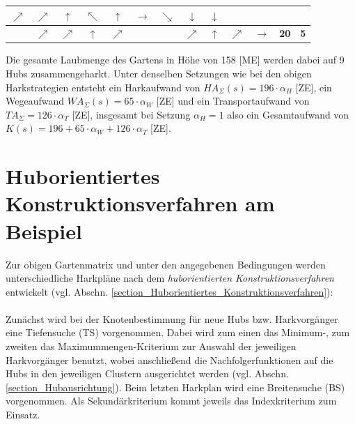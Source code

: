 \begin{center}
\begin{minipage}{\textwidth}
\begin{table}[H]
\begin{scriptsize}
\begin{tabular}{|>{}c|>{}c|>{}c|>{}c|>{}c|>{}c|>{}c|>{}c|>{}c|>{}c|>{}c|>{}c|>{}c|}
$\nearrow$&\cellcolor{yellow!15!white}$\nearrow$&\cellcolor{yellow!15!white}$\uparrow$&\cellcolor{yellow!15!white}$\nwarrow$&\cellcolor{red!15!white}$\uparrow$ &\cellcolor{green!15!white}$\rightarrow$&\cellcolor{green!15!white}$\searrow$&\cellcolor{green!15!white}$\downarrow$&\cellcolor{blue!15!white}$\downarrow$\\
\hline
\cellcolor{gray!50!white} &\cellcolor{red!15!white}$\nearrow$&\cellcolor{red!15!white}$\nearrow$&\cellcolor{red!15!white}$\uparrow$&
\cellcolor{yellow!15!white}$\nearrow$&\cellcolor{gray!50!white} &\cellcolor{gray!50!white} &\cellcolor{red!15!white}$\nearrow$&\cellcolor{red!15!white}$\uparrow$& \cellcolor{green!15!white}$\nearrow$&\cellcolor{green!15!white}$\rightarrow$&\cellcolor{green!15!white}\bf{20}&\cellcolor{blue!15!white}\bf{5} \\
\hline
\end{tabular}
\label{Beispiel_Harkplan_CO_NW}
\end{scriptsize} 
\end{table}
\renewcommand{\arraystretch}{1}
\end{minipage}
\end{center}

\noindent Die gesamte Laubmenge des Gartens in Höhe von 158 [ME] werden dabei auf 9 Hubs zusammengeharkt. Unter denselben Setzungen wie bei den obigen Harkstrategien entsteht ein Harkaufwand von $HA_{\Sigma}(s)=196 \cdot \alpha_H$ [ZE], ein Wegeaufwand $WA_{\Sigma}(s) = 65 \cdot \alpha_W$ [ZE] und ein Transportaufwand von $TA_{\Sigma} = 126\cdot \alpha_T$ [ZE], insgesamt bei Setzung $\alpha_H = 1$ also ein Gesamtaufwand von $K(s) = 196 + 65 \cdot \alpha_W + 126\cdot \alpha_T$ [ZE].


\section{Huborientiertes Konstruktionsverfahren am Beispiel}\label{Beispiel Huborientiertes Verfahren}

\noindent Zur obigen Gartenmatrix und unter den angegebenen Bedingungen werden unterschiedliche Harkpläne nach dem \textit{huborientierten Konstruktionsverfahren} entwickelt (vgl. Abschn. \ref{section_Huborientiertes_Konstruktionsverfahren}): \\
\\
Zunächst wird bei der Knotenbestimmung für neue Hubs bzw. Harkvorgänger eine Tiefensuche (TS) vorgenommen. Dabei wird zum einen das Minimum-, zum zweiten das Maximummengen-Kriterium zur Auswahl der jeweiligen Harkvorgänger benutzt, wobei anschließend die Nachfolgerfunktionen auf die Hubs in den jeweiligen Clustern ausgerichtet werden (vgl. Abschn. \ref{section_Hubausrichtung}). Beim letzten Harkplan wird eine Breitensuche (BS) vorgenommen. Als Sekundärkriterium kommt jeweils das Indexkriterium zum Einsatz. 


